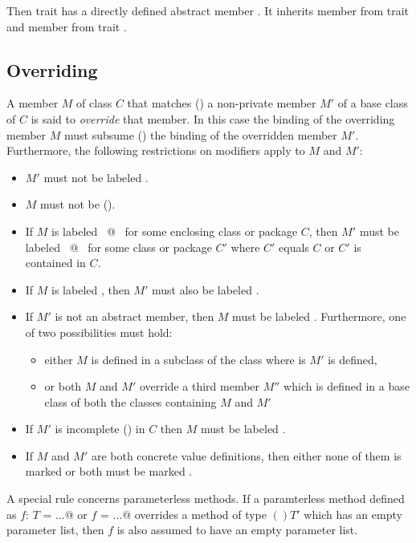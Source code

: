 Then trait  has a directly defined abstract member . It
inherits member  from trait  and member  from
trait .

\subsection{Overriding}
\label{sec:overriding}


A member $M$ of class $C$ that matches () 
a non-private member $M'$ of a
base class of $C$ is said to {\em override} that member.  In this case
the binding of the overriding member $M$ must subsume
() the binding of the overridden member $M'$.
Furthermore, the following restrictions on modifiers apply to $M$ and
$M'$:
\begin{itemize}
\item
$M'$ must not be labeled .
\item
$M$ must not be  ().
\item
If $M$ is labeled ~\lstinline@private[$C$]@~ for some enclosing class or package $C$,
then $M'$ must be labeled ~\lstinline@private[$C'$]@~ for some class or package $C'$ where
$C'$ equals $C$ or $C'$ is contained in $C$. 
\item
If $M$ is labeled , then $M'$ must also be
labeled .
\item
If $M'$ is not an abstract member, then
$M$ must be labeled .
Furthermore, one of two possibilities must hold:
\begin{itemize}
\item either $M$ is defined in a subclass of the class where is $M'$ is defined, 
\item or both $M$ and $M'$ override a third member $M''$ which is defined
      in a base class of both the classes containing $M$ and $M'$ 
\end{itemize}
\item
If $M'$ is incomplete () in $C$ then $M$ must be
labeled .
\item 
If $M$ and $M'$ are both concrete value definitions, then either none
of them is marked  or both must be marked .
\end{itemize}
A special rule concerns parameterless methods. If a paramterless
method defined as \lstinline@def $f$: $T$ = ...@ or 
\lstinline@def $f$ = ...@ overrides a method of
type $()T'$ which has an empty parameter list, then $f$ is also
assumed to have an empty parameter list.

